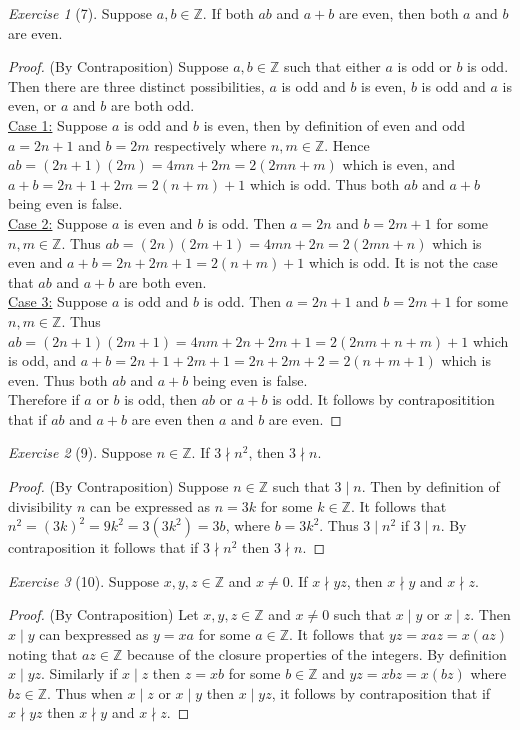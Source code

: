 \documentclass[12pt]{amsart}
\theoremstyle{remark}
\newtheorem*{exercise}{Exercise}%
\def\ZZ{\ensuremath{\mathbb Z}}
\theoremstyle{mycomment}
\begin{document}
\begin{exercise}[7] Suppose $a,b\in\ZZ$. If both $ab$ and $a+b$ are even, then both $a$ and $b$ are even.
\begin{proof}
	(By Contraposition) Suppose $a,b \in \ZZ$ such that either $a$ is odd or $b$ is odd. Then there are three distinct possibilities, $a$ is odd and $b$ is even, $b$ is odd and $a$ is even, or $a$ and $b$ are both odd. \\
	\underline{Case 1:} Suppose $a$ is odd and $b$ is even, then by definition of even and odd $a = 2n+1$ and $b = 2m$ respectively where $n,m \in \ZZ$. Hence $ab = (2n+1)(2m) = 4mn + 2m = 2(2mn+m)$ which is even, and $a + b = 2n+1 + 2m = 2(n + m) + 1$ which is odd. Thus both $ab$ and $a+b$ being even is false. \\ 
	\underline{Case 2:} Suppose $a$ is even and $b$ is odd. Then $a = 2n$ and $b = 2m+1$ for some $n,m \in \ZZ$. Thus $ab = (2n)(2m+1) = 4mn +2n = 2(2mn + n)$ which is even and $a + b = 2n + 2m+1 = 2(n+m) +1$ which is odd. It is not the case that $ab$ and $a+b$ are both even. \\
	\underline{Case 3:} Suppose $a$ is odd and $b$ is odd. Then $a = 2n + 1$ and $b = 2m + 1$ for some $n,m \in \ZZ$. Thus $ab = (2n+1)(2m+1) = 4nm +2n + 2m + 1 = 2(2nm + n + m) + 1$ which is odd, and $a + b = 2n+1 + 2m+1 = 2n + 2m + 2 = 2(n + m + 1)$ which is even. Thus both $ab$ and $a+b$ being even is false. \\
	Therefore if $a$ or $b$ is odd, then $ab$ or $a+b$ is odd. It follows by contrapositition that if $ab$ and $a+b$ are even then $a$ and $b$ are even.
\end{proof}
\end{exercise}

\begin{exercise}[9] Suppose $n\in\ZZ$. If $3\nmid n^{2}$, then $3\nmid n$. %
\begin{proof}
	(By Contraposition)	Suppose $n\in\ZZ$ such that $3 \mid n$. Then by definition of divisibility $n$ can be expressed as $n = 3k$ for some $k \in \ZZ$. It follows that $n^2 = (3k)^2 = 9k^2 = 3(3k^2) = 3b$, where $b = 3k^2$. Thus $3 \mid n^2$ if $3 \mid n$. By contraposition it follows that if $3 \nmid n^2$ then $3 \nmid n$.
\end{proof}
\end{exercise}

\begin{exercise}[10] Suppose $x,y,z\in\ZZ$ and $x\ne 0$.
If $x\nmid yz$, then $x\nmid y$ and $x\nmid z$.
\begin{proof}
	(By Contraposition) Let $x,y,z \in \ZZ$ and $x \ne 0$ such that $x \mid y$ or $x \mid z$. Then $x \mid y$ can bexpressed as $y = xa$ for some $a \in \ZZ$. It follows that $yz = xaz = x(az)$ noting that $az\in\ZZ$ because of the closure properties of the integers. By definition $x \mid yz$. Similarly if $x \mid z$ then $z = xb$ for some $b \in \ZZ$ and $yz = xbz = x(bz)$ where $bz \in \ZZ$. Thus when $x \mid z$ or $x \mid y$ then $x \mid yz$, it follows by contraposition that if $x\nmid yz$ then $x \nmid y$ and $x \nmid z$.
\end{proof}
\end{exercise}
\end{document}
